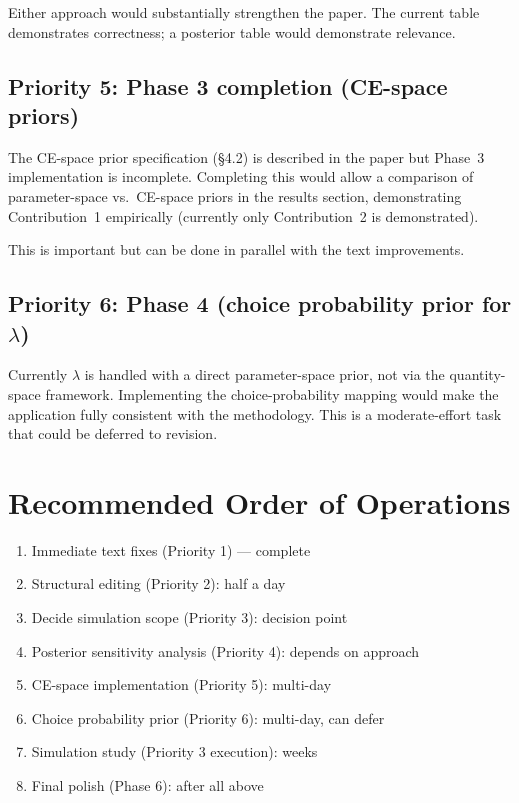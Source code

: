 \documentclass[12pt,a4paper]{article}
\begin{document}
Either approach would substantially strengthen the paper. The current table
demonstrates correctness; a posterior table would demonstrate relevance.

\subsection{Priority 5: Phase 3 completion (CE-space priors)}

The CE-space prior specification (\S4.2) is described in the paper but
Phase~3 implementation is incomplete. Completing this would allow a
comparison of parameter-space vs.\ CE-space priors in the results section,
demonstrating Contribution~1 empirically (currently only Contribution~2 is
demonstrated).

This is important but can be done in parallel with the text improvements.

\subsection{Priority 6: Phase 4 (choice probability prior for $\lambda$)}

Currently $\lambda$ is handled with a direct parameter-space prior, not via
the quantity-space framework. Implementing the choice-probability mapping
would make the application fully consistent with the methodology. This is
a moderate-effort task that could be deferred to revision.


\section{Recommended Order of Operations}

\begin{enumerate}
  \item[{[x]}] Immediate text fixes (Priority 1) --- complete
  \item Structural editing (Priority 2): half a day
  \item Decide simulation scope (Priority 3): decision point
  \item Posterior sensitivity analysis (Priority 4): depends on approach
  \item CE-space implementation (Priority 5): multi-day
  \item Choice probability prior (Priority 6): multi-day, can defer
  \item Simulation study (Priority 3 execution): weeks
  \item Final polish (Phase 6): after all above
\end{enumerate}
\end{document}
